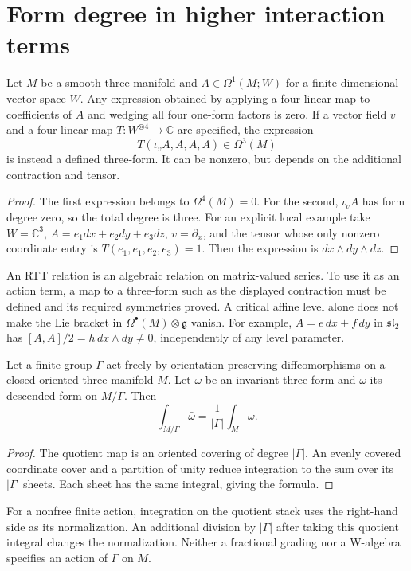 \section{Form degree in higher interaction terms}

\begin{proposition}
\label{prop:cbc26-quartic-degree}
Let $M$ be a smooth three-manifold and $A\in\Omega^1(M;W)$ for a finite-dimensional vector space $W$.
Any expression obtained by applying a four-linear map to coefficients of $A$ and wedging all four one-form factors is zero.
If a vector field $v$ and a four-linear map $T:W^{\otimes4}\to\mathbb C$ are specified, the expression
\[
 T(\iota_vA,A,A,A)\in\Omega^3(M)
\]
is instead a defined three-form.
It can be nonzero, but depends on the additional contraction and tensor.
\end{proposition}
\begin{proof}
The first expression belongs to $\Omega^4(M)=0$.
For the second, $\iota_v A$ has form degree zero, so the total degree is three.
For an explicit local example take $W=\mathbb C^3$, $A=e_1dx+e_2dy+e_3dz$, $v=\partial_x$, and the tensor whose only nonzero coordinate entry is $T(e_1,e_1,e_2,e_3)=1$.
Then the expression is $dx\wedge dy\wedge dz$.
\end{proof}

An RTT relation is an algebraic relation on matrix-valued series.
To use it as an action term, a map to a three-form such as the displayed contraction must be defined and its required symmetries proved.
A critical affine level alone does not make the Lie bracket in $\Omega^\bullet(M)\otimes\mathfrak g$ vanish.
For example, $A=e\,dx+f\,dy$ in $\mathfrak{sl}_2$ has $[A,A]/2=h\,dx\wedge dy\ne0$, independently of any level parameter.

\begin{proposition}
\label{prop:cbc26-quotient-integral}
Let a finite group $\Gamma$ act freely by orientation-preserving diffeomorphisms on a closed oriented three-manifold $M$.
Let $\omega$ be an invariant three-form and $\bar\omega$ its descended form on $M/\Gamma$.
Then
\[
 \int_{M/\Gamma}\bar\omega=\frac1{|\Gamma|}\int_M\omega.
\]
\end{proposition}
\begin{proof}
The quotient map is an oriented covering of degree $|\Gamma|$.
An evenly covered coordinate cover and a partition of unity reduce integration to the sum over its $|\Gamma|$ sheets.
Each sheet has the same integral, giving the formula.
\end{proof}

For a nonfree finite action, integration on the quotient stack uses the right-hand side as its normalization.
An additional division by $|\Gamma|$ after taking this quotient integral changes the normalization.
Neither a fractional grading nor a W-algebra specifies an action of $\Gamma$ on $M$.
